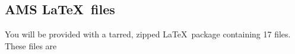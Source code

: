 \documentclass{ametsocV5}
\begin{document}
%
%
%


\appendix[B]

\subsection{AMS \LaTeX\ files}
You will be provided with a tarred, zipped \LaTeX\ package containing 
17 files. These files are
\end{document}
